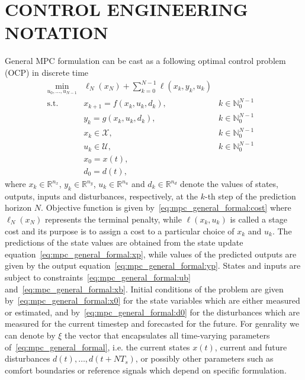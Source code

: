 \documentclass[10pt]{extarticle}
\begin{document}
\section{CONTROL ENGINEERING NOTATION}

General MPC formulation can be cast as a following optimal control problem (OCP) in discrete time
\begin{subequations}
	\label{eq:mpc_general_formal}
	\begin{align}
	\min_{u_0, \ldots, u_{N-1}} & \ell_N(x_N) + \sum_{k=0}^{N-1} \ell(x_k, y_k, u_k) &
	\label{eq:mpc_general_formal:cost}\\
	\text{s.t.} \ & x_{k+1} = f(x_k, u_k, d_k),  & k \in \mathbb{N}_{0}^{N-1} & \label{eq:mpc_general_formal:xp} \\
	& y_{k} = g(x_k, u_k, d_k),  & k \in \mathbb{N}_{0}^{N-1} & \label{eq:mpc_general_formal:yp} \\
	&  x_{k} \in \mathcal{X},  & k \in \mathbb{N}_{0}^{N-1}   \label{eq:mpc_general_formal:ub}\\
	& u_{k} \in \mathcal{U}, & k \in \mathbb{N}_{0}^{N-1} 
	\label{eq:mpc_general_formal:xb}\\
	& x_0 = x(t),\label{eq:mpc_general_formal:x0} \\
	& d_0 = d(t),\label{eq:mpc_general_formal:d0}
	\end{align}
\end{subequations}
where $x_k \in \mathbb{R}^{n_x}$, $y_k \in \mathbb{R}^{n_y}$, $u_k \in \mathbb{R}^{n_u}$ and $d_k \in \mathbb{R}^{n_d}$ denote the values of states, outputs,
inputs and disturbances, respectively, at the $k$-th step of the prediction
horizon $N$. 
Objective function is given by~\eqref{eq:mpc_general_formal:cost} where   $\ell_N(x_N)$  represents the terminal penalty,
while $\ell(x_k,u_k)$  is called a stage cost and its
purpose is to assign a cost to a particular choice of $x_k$ and
$u_k$.
The predictions of the state values are obtained from the state update equation~\eqref{eq:mpc_general_formal:xp}, while values of the predicted outputs are given by
the output equation~\eqref{eq:mpc_general_formal:yp}.
States and inputs are subject to
constraints~\eqref{eq:mpc_general_formal:ub} and~\eqref{eq:mpc_general_formal:xb}.
Initial conditions of the problem are given by~\eqref{eq:mpc_general_formal:x0} for the state variables which are either  measured or estimated, and by~\eqref{eq:mpc_general_formal:d0} for the disturbances which are measured for the current timestep and forecasted for the future.
For genrality we can denote by $\xi$ the vector that encapsulates all time-varying parameters
of~\eqref{eq:mpc_general_formal}, i.e. the current states $x(t)$,
current and future disturbances $d(t), \ldots, d(t+N T_s)$, or possibly other parameters such as comfort boundaries or reference signals which depend on specific formulation.
\end{document}
